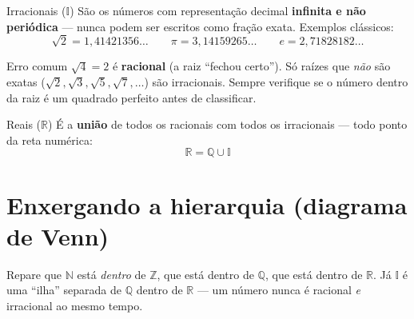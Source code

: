 \documentclass[12pt,a4paper]{article}
\begin{document}
\begin{definicao}{Irracionais ($\mathbb{I}$)}
São os números com representação decimal \textbf{infinita e não periódica}
— nunca podem ser escritos como fração exata. Exemplos clássicos:
\[
\sqrt{2} = 1{,}41421356\ldots \qquad \pi = 3{,}14159265\ldots \qquad e = 2{,}71828182\ldots
\]
\end{definicao}

\begin{atencao}{Erro comum}
$\sqrt{4} = 2$ é \textbf{racional} (a raiz ``fechou certo''). Só raízes que
\emph{não} são exatas ($\sqrt{2}, \sqrt{3}, \sqrt{5}, \sqrt{7}, \dots$) são
irracionais. Sempre verifique se o número dentro da raiz é um quadrado
perfeito antes de classificar.
\end{atencao}

\begin{definicao}{Reais ($\mathbb{R}$)}
É a \textbf{união} de todos os racionais com todos os irracionais — todo
ponto da reta numérica:
\[
\mathbb{R} = \mathbb{Q} \cup \mathbb{I}
\]
\end{definicao}

\section{Enxergando a hierarquia (diagrama de Venn)}

Repare que $\mathbb{N}$ está \emph{dentro} de $\mathbb{Z}$, que está dentro de
$\mathbb{Q}$, que está dentro de $\mathbb{R}$. Já $\mathbb{I}$ é uma ``ilha''
separada de $\mathbb{Q}$ dentro de $\mathbb{R}$ — um número nunca é racional
\emph{e} irracional ao mesmo tempo.

\begin{center}
\end{center}
\end{document}
